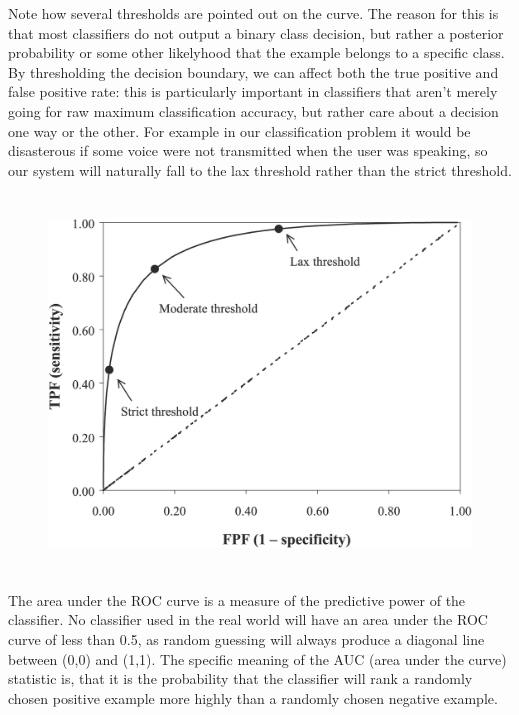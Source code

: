 \documentclass[ %
                    author={Sam Phippen},
                supervisor={Dr. Rafal Bogacz},
                     title={Real time voice activity detectors in noisy personal computing environments},
                  subtitle={},
                    degree={MEng},
                      year={2012} ]{thesis}
\begin{document}
Note how several thresholds are pointed out on the curve. The reason for this
is that most classifiers do not output a binary class decision, but rather a
posterior probability or some other likelyhood that the example belongs to a
specific class. By thresholding the decision boundary, we can affect both the
true positive and false positive rate: this is particularly important in
classifiers that aren't merely going for raw maximum classification accuracy,
but rather care about a decision one way or the other. For example in our
classification problem it would be disasterous if some voice were not
transmitted when the user was speaking, so our system will naturally fall to
the lax threshold rather than the strict threshold.

\begin{figure}
    \label{fig:roc-example}
    \begin{center}
        \includegraphics[height=10cm]{roc_example.png}
    \end{center}
\end{figure}

The area under the ROC curve is a measure of the predictive power of the
classifier\cite{fawcett}. No classifier used in the real world will have an
area under the ROC curve of less than 0.5, as random guessing will always
produce a diagonal line between (0,0) and (1,1). The specific meaning of the
AUC (area under the curve) statistic is, that it is the probability that the
classifier will rank a randomly chosen positive example more highly than a
randomly chosen negative example.

\end{document}
